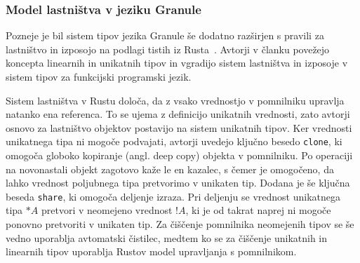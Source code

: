 \subsubsection{Model lastništva v jeziku Granule}

Pozneje je bil sistem tipov jezika Granule še dodatno razširjen s pravili za lastništvo in izposojo na podlagi tistih iz Rusta~\cite{marshall2024functional}. Avtorji v članku povežejo koncepta linearnih in unikatnih tipov in vgradijo sistem lastništva in izposoje v sistem tipov za funkcijski programski jezik.

Sistem lastništva v Rustu določa, da z vsako vrednostjo v pomnilniku upravlja natanko ena referenca. To se ujema z definicijo unikatnih vrednosti, zato avtorji osnovo za lastništvo objektov postavijo na sistem unikatnih tipov. Ker vrednosti unikatnega tipa ni mogoče podvajati, avtorji uvedejo ključno besedo \texttt{clone}, ki omogoča globoko kopiranje (angl. deep copy) objekta v pomnilniku. Po operaciji na novonastali objekt zagotovo kaže le en kazalec, s čemer je omogočeno, da lahko vrednost poljubnega tipa pretvorimo v unikaten tip. Dodana je še ključna beseda \texttt{share}, ki omogoča deljenje izraza. Pri deljenju se vrednost unikatnega tipa $*A$ pretvori v neomejeno vrednost $!A$, ki je od takrat naprej ni mogoče ponovno pretvoriti v unikaten tip. Za čiščenje pomnilnika neomejenih tipov se še vedno uporablja avtomatski čistilec, medtem ko se za čiščenje unikatnih in linearnih tipov uporablja Rustov model upravljanja s pomnilnikom.


